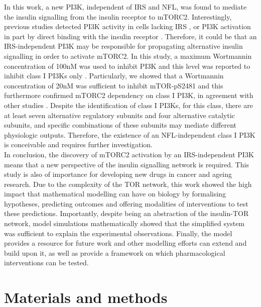 In this work, a new PI3K, independent of IRS and NFL, was found to mediate the insulin signalling from the insulin receptor to mTORC2. Interestingly, previous studies detected PI3K activity in cells lacking IRS \citep{Myers1994, Peruzzi1999}, or PI3K activation in part by direct binding with the insulin receptor \citep{VanHorn1994}. Therefore, it could be that an IRS-independent PI3K may be responsible for propagating alternative insulin signalling in order to activate mTORC2. In this study, a maximum Wortmannin concentration of 100nM was used to inhibit PI3K and this level was reported to inhibit class I PI3Ks only \citep{Brunn1996}. Particularly, we showed that a Wortmannin concentration of 20nM was sufficient to inhibit mTOR-pS2481 and this furthermore confirmed mTORC2 dependency on class I PI3K, in agreement with other studies \citep{Peterson2000, Soliman2010}. Despite the identification of class I PI3Ks, for this class, there are at least seven alternative regulatory subunits and four alternative 
catalytic subunits, and specific combinations of these subunits may mediate different physiologic outputs. Therefore, the existence of an NFL-independent class I PI3K is conceivable and requires further investigation.\\
In conclusion, the discovery of mTORC2 activation by an IRS-independent PI3K means that a new perspective of the insulin signalling network is required. This study is also of importance for developing new drugs in cancer and ageing research. Due to the complexity of the TOR network, this work showed the high impact that mathematical modelling can have on biology by formalising hypotheses, predicting outcomes and offering modalities of interventions to test these predictions. Importantly, despite being an abstraction of the insulin-TOR network, model simulations mathematically showed that the simplified system was sufficient to explain the experimental observations. Finally, the model provides a resource for future work and other modelling efforts can extend and build upon it, as well as provide a framework on which pharmacological interventions can be tested. 


\section{Materials and methods}
\label{paper1-sec:Materials and methods}
